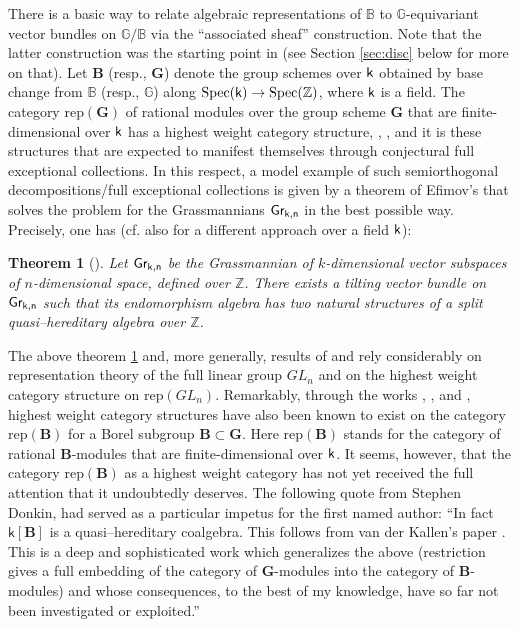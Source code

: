 \documentclass[sn-mathphys-num]{sn-jnl}%
\newcommand{\rep}{{\mathrm{rep}}}
\newcommand{\sk}{{\sf k}}
\newcommand{\Gm}{\mathbb G}
\newcommand{\Bm}{\mathbb B}
\newcommand{\bg}{\mathbf G}
\newcommand{\fb}{\mathbf B}
\newtheorem{theorem}{Theorem}[section]
\theoremstyle{definition}
\begin{document}
There is a basic way to relate algebraic representations of $\Bm$ to $\Gm$-equivariant vector bundles on $\Gm/\Bm$ via the ``associated sheaf'' construction. 
Note that the latter construction was the starting point in \cite{KuzPol} (see Section \ref{sec:disc} below for more on that). Let $\fb$ (resp., $\bg$) denote the group schemes over $\sk$ obtained  
by base change from $\Bm$ (resp., $\Gm$) along ${\rm Spec}(\sk)\rightarrow {\rm Spec}(\mathbb Z)$, where $\sk$ is a field.
The category $\rep(\bg)$ of rational modules over the group scheme $\bg$ that are finite-dimensional over $\sk$ has a highest weight category structure, \cite{CPSHW}, \cite {Donkin1}, and it is these  structures that are expected to manifest themselves through conjectural full exceptional collections. 
In this respect, a model example of such semiorthogonal decompositions/full exceptional collections is given by a theorem of Efimov's \cite{Ef} that solves the problem for the Grassmannians $\sf Gr_{k,n}$ in the best possible way. 
Precisely, one has (cf. also \cite{BLVdB} for a different approach over a field $\sk$):\\

\begin{theorem}[{\cite[Theorem 1.8]{Ef}}]\label{th:Ef}
Let  $\sf Gr_{k,n}$ be the Grassmannian of $k$-dimensional vector subspaces of $n$-dimensional space, defined over $\mathbb Z$. 
There exists a tilting vector bundle on  $\sf Gr_{k,n}$ such that its endomorphism algebra has two natural structures of a split quasi--hereditary algebra over $\mathbb Z$.\\
\end{theorem}


The above theorem \ref{th:Ef} and, more generally, results of \cite{Ef} and \cite{BLVdB} rely considerably on representation theory of the full linear group $GL_n$ and on the highest weight category structure on $\rep(GL_n)$.
Remarkably, through the works \cite{Math}, \cite{Polo3}, \cite{WvdK} and \cite{WvdKTata}, highest weight category structures have also been known to exist on the category $\rep( \fb)$ for a Borel subgroup $ \fb\subset  \bg$. Here $\rep( \fb)$ stands for the category of rational $\fb$-modules that are finite-dimensional over $\sk$.
It seems, however, that the category $\rep( \fb)$ as a highest weight category has not yet received the full attention that it undoubtedly deserves. 
The following quote from Stephen Donkin, \cite[Remark 4.7]{Donsur} had served as a particular impetus for the first named author: ``In fact ${\mathsf k}[{\fb}]$ is a quasi--hereditary coalgebra. 
This follows from van der Kallen's paper \cite{WvdK}. 
This is a deep and sophisticated work which generalizes the above (restriction gives a full embedding of the category of $ \bg$-modules into the category of $\fb$-modules) and whose consequences, to the best of my knowledge, have so far not been investigated or exploited.''
\end{document}

